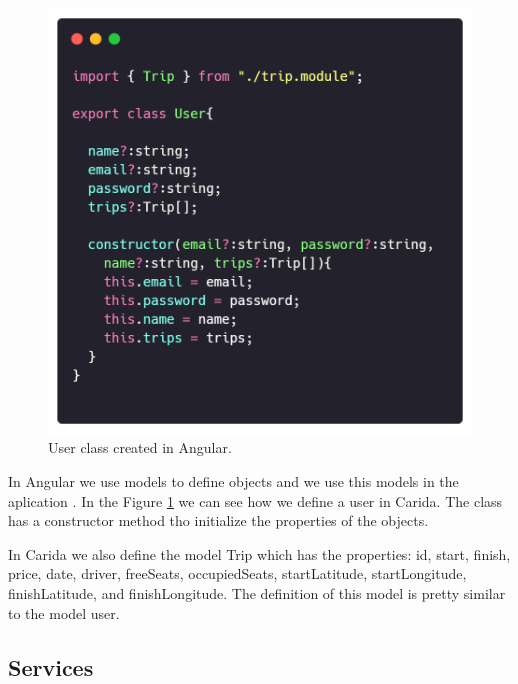 \documentclass{article}
\begin{document}
  \begin{figure}[h]
    \centering
    \includegraphics[width=0.8\columnwidth]{figures/user.module.ts.png}
    \caption{User class created in Angular.\label{fig:user.module.ts}}
    \end{figure}
    
    In Angular we use models to define objects and we use this models in the aplication \cite{caridaCode}. In the Figure \ref{fig:user.module.ts} we can see how we define a user in Carida. The class has a constructor method tho initialize the properties of the objects.

    In Carida we also define the model Trip which has the properties: id, start, finish, price, date, driver, freeSeats, occupiedSeats, startLatitude, startLongitude, finishLatitude, and finishLongitude. The definition of this model is pretty similar to the model user.

    
    \subsection*{Services}
\end{document}

